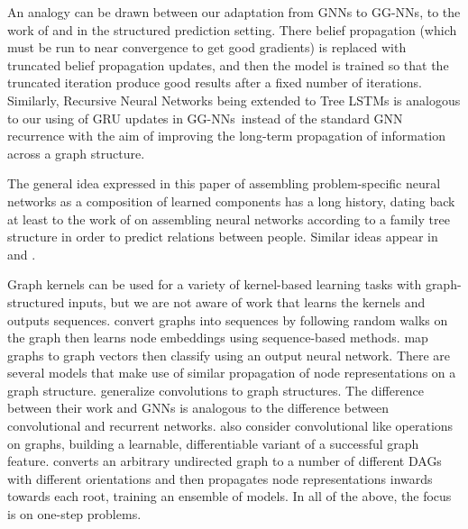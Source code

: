 \documentclass{article} %
\newcommand{\OurMethodMinorShort}{GG-NN}
\newcommand{\OurMethodMinorShorts}{\OurMethodMinorShort s}
\begin{document}
An analogy can be drawn between 
our adaptation from GNNs to \OurMethodMinorShorts, to the work of
\cite{domke2011parameter} and \cite{stoyanov2011empirical} in the structured prediction setting.
There belief propagation (which must be run to near convergence to
get good gradients) is replaced with truncated belief propagation updates, and
then the model is trained so that the truncated iteration produce good
results after a fixed number of iterations.
Similarly, Recursive Neural Networks
\citep{goller1996learning,socher2011parsing} being extended to Tree LSTMs
\citep{tai2015improved} is analogous to our using of GRU updates in
\OurMethodMinorShorts~instead of the standard GNN recurrence with the aim of
improving the long-term propagation of information across a graph structure.

The general idea expressed in this paper of assembling
problem-specific neural networks as a composition of learned
components has a long history, dating back at least to the work of
\cite{hinton1988representing} on assembling neural networks according
to a family tree structure in order to predict relations between
people. Similar ideas appear in \cite{hammer2004neural} and \cite{bottou2014machine}.

Graph kernels
\citep{shervashidze2011weisfeiler,kashima2003marginalized} can be used
for a variety of kernel-based learning tasks with graph-structured
inputs, but we are not aware of work that learns the kernels and
outputs sequences.  \cite{perozzi2014deepwalk} convert graphs into sequences by
following random walks on the graph then learns node embeddings using
sequence-based methods.
\cite{sperduti1997supervised} map graphs to graph vectors then
classify using an output neural network.
There are several models that make use of similar propagation of node
representations on a graph structure.
\cite{bruna2013spectral} generalize
convolutions to graph structures.  The difference between their work
and GNNs is analogous to the difference between convolutional and
recurrent networks.
\cite{duvenaud2015convolutional} also consider convolutional like
operations on graphs, building a learnable, differentiable variant of
a successful graph feature.
%
\cite{lusci2013deep} converts an arbitrary
undirected graph to a number of different DAGs with different
orientations and then propagates node representations inwards towards
each root, training an ensemble of models.
In all of the above, the focus is on one-step problems.
\end{document}
